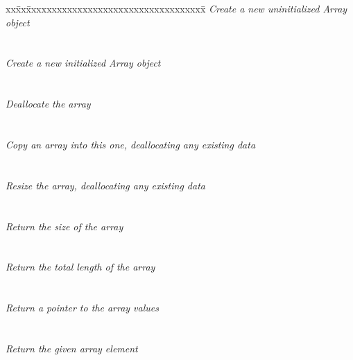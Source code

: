 \begin{tabbing}
xx\=xx\=xxxxxxxxxxxxxxxxxxxxxxxxxxxxxxxxxxx\= \kill
\> \todo \> \textit{Create a new uninitialized Array object} \\
\>       \>  \\ \\
\> \todo \> \textit{Create a new initialized Array object} \\
\>       \>  \\ \\
\> \todo \> \textit{Deallocate the array} \\
\>       \>   \\ \\
\> \todo \> \textit{Copy an array into this one, deallocating any existing data} \\
\>       \>   \\ \\
\> \todo \> \textit{Resize the array, deallocating any existing data} \\
\>       \>    \\ \\
\> \todo \> \textit{Return the size of the array} \\
\>       \>   \\ \\
\> \todo \> \textit{Return the total length of the array} \\
\>       \>   \\ \\
\> \todo \> \textit{Return a pointer to the array values} \\
\>       \>   \\ \\
\> \todo \> \textit{Return the given array element} \\
\>       \> 
\end{tabbing}


